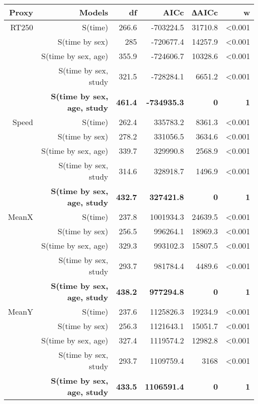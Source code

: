 \documentclass[a4paper,11pt]{article}
\begin{document}
\begin{table}[htbp]
    \begin{tabular}{rrrrrr}
      \\
      \hline  
      Proxy & Models & df    & AICc  & ∆AICc & w \\
      \hline
      RT250 & S(time) & 266.6 & -703224.5 & 31710.8 & <0.001 \\
            & S(time by sex) & 285   & -720677.4 & 14257.9 & <0.001 \\
            & S(time by sex, age) & 355.9 & -724606.7 & 10328.6 & <0.001 \\
            & S(time by sex, study & 321.5 & -728284.1 & 6651.2 & <0.001 \\
            & \textbf{S(time by sex, age, study} & \textbf{461.4} & \textbf{-734935.3} & \textbf{0} & \textbf{1} \\        
      \hline
      Speed & S(time) & 262.4 & 335783.2 & 8361.3 & <0.001 \\
            & S(time by sex) & 278.2 & 331056.5 & 3634.6 & <0.001 \\
            & S(time by sex, age) & 339.7 & 329990.8 & 2568.9 & <0.001 \\
            & S(time by sex, study & 314.6 & 328918.7 & 1496.9 & <0.001 \\
            & \textbf{S(time by sex, age, study} & \textbf{432.7} & \textbf{327421.8} & \textbf{0} & \textbf{1} \\
      \hline
      MeanX & S(time) & 237.8 & 1001934.3 & 24639.5 & <0.001 \\
            & S(time by sex) & 256.5 & 996264.1 & 18969.3 & <0.001 \\
            & S(time by sex, age) & 329.3 & 993102.3 & 15807.5 & <0.001 \\
            & S(time by sex, study & 293.7 & 981784.4 & 4489.6 & <0.001 \\
            & \textbf{S(time by sex, age, study} & \textbf{438.2} & \textbf{977294.8} & \textbf{0} & \textbf{1} \\       
      \hline
      MeanY & S(time) & 237.6 & 1125826.3 & 19234.9 & <0.001 \\
            & S(time by sex) & 256.3 & 1121643.1 & 15051.7 & <0.001 \\
            & S(time by sex, age) & 327.4 & 1119574.2 & 12982.8 & <0.001 \\
            & S(time by sex, study & 293.7 & 1109759.4 & 3168  & <0.001 \\
            & \textbf{S(time by sex, age, study} & \textbf{433.5} & \textbf{1106591.4} & \textbf{0} & \textbf{1} \\
      \hline 
    \end{tabular}
  \label{tab:addlabel}
  \end{table}
 
\end{document}
